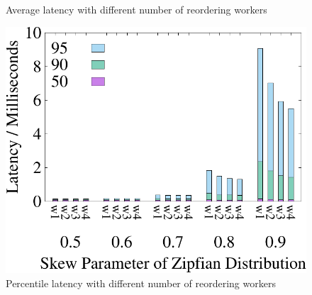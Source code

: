 \begin{figure}[t]
\begin{minipage}[b]{0.31\linewidth}
	\caption{Average latency with different number of reordering workers}
	\label{fig:reorder:latency}
	\end{minipage}    
	\begin{minipage}[b]{0.31\linewidth}
	\centering
	\includegraphics[width=\textwidth]{./exp_fig/reorder/percent95_latency}
	\caption{Percentile latency with different number of reordering workers}
	\label{fig:reorder:p95}
	\end{minipage}    
\end{figure}


